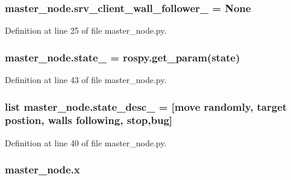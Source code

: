\subsubsection[{\texorpdfstring{srv\+\_\+client\+\_\+wall\+\_\+follower\+\_\+}{srv_client_wall_follower_}}]{\setlength{\rightskip}{0pt plus 5cm}master\+\_\+node.\+srv\+\_\+client\+\_\+wall\+\_\+follower\+\_\+ = None}\hypertarget{namespacemaster__node_afde90e85906bb75fd698d31876e4060a}{}\label{namespacemaster__node_afde90e85906bb75fd698d31876e4060a}


Definition at line 25 of file master\+\_\+node.\+py.

\subsubsection[{\texorpdfstring{state\+\_\+}{state_}}]{\setlength{\rightskip}{0pt plus 5cm}master\+\_\+node.\+state\+\_\+ = rospy.\+get\+\_\+param(\textquotesingle{}state\textquotesingle{})}\hypertarget{namespacemaster__node_aceeacc0099424e36d80c5c244ed91886}{}\label{namespacemaster__node_aceeacc0099424e36d80c5c244ed91886}


Definition at line 43 of file master\+\_\+node.\+py.

\subsubsection[{\texorpdfstring{state\+\_\+desc\+\_\+}{state_desc_}}]{\setlength{\rightskip}{0pt plus 5cm}list master\+\_\+node.\+state\+\_\+desc\+\_\+ = \mbox{[}\textquotesingle{}move randomly\textquotesingle{}, \textquotesingle{}target postion\textquotesingle{}, \textquotesingle{}walls following\textquotesingle{}, \textquotesingle{}stop\textquotesingle{},\textquotesingle{}bug\textquotesingle{}\mbox{]}}\hypertarget{namespacemaster__node_a8aa254dac660c2d7728f527c2226ed1b}{}\label{namespacemaster__node_a8aa254dac660c2d7728f527c2226ed1b}


Definition at line 40 of file master\+\_\+node.\+py.

\subsubsection[{\texorpdfstring{x}{x}}]{\setlength{\rightskip}{0pt plus 5cm}master\+\_\+node.\+x}\hypertarget{namespacemaster__node_a9ea1782ac4a7c8c92e8555fa503ac755}{}\label{namespacemaster__node_a9ea1782ac4a7c8c92e8555fa503ac755}


